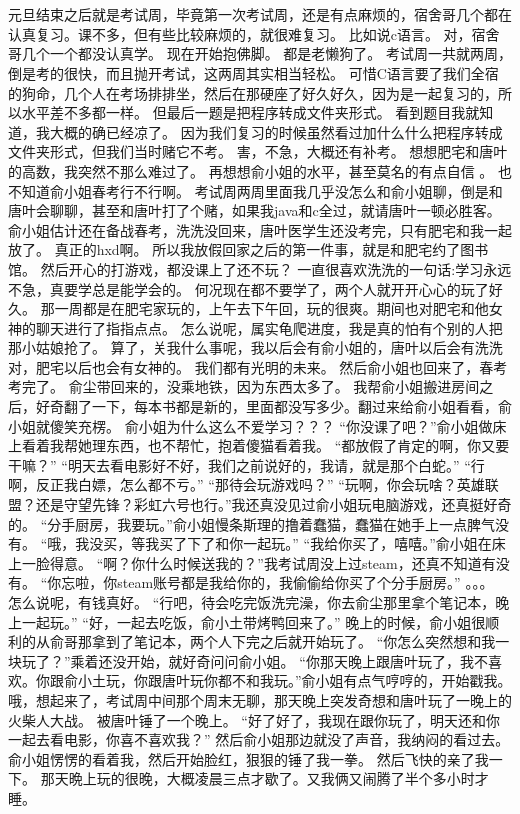\chapter{}
元旦结束之后就是考试周，毕竟第一次考试周，还是有点麻烦的，宿舍哥几个都在认真复习。课不多，但有些比较麻烦的，就很难复习。
比如说c语言。
对，宿舍哥几个一个都没认真学。
现在开始抱佛脚。
都是老懒狗了。
考试周一共就两周，倒是考的很快，而且抛开考试，这两周其实相当轻松。
可惜C语言要了我们全宿的狗命，几个人在考场排排坐，然后在那硬座了好久好久，因为是一起复习的，所以水平差不多都一样。
但最后一题是把程序转成文件夹形式。
看到题目我就知道，我大概的确已经凉了。
因为我们复习的时候虽然看过加什么什么把程序转成文件夹形式，但我们当时赌它不考。
害，不急，大概还有补考。
想想肥宅和唐叶的高数，我突然不那么难过了。
再想想俞小姐的水平，甚至莫名的有点自信 。
也不知道俞小姐春考行不行啊。
考试周两周里面我几乎没怎么和俞小姐聊，倒是和唐叶会聊聊，甚至和唐叶打了个赌，如果我java和c全过，就请唐叶一顿必胜客。
俞小姐估计还在备战春考，洗洗没回来，唐叶医学生还没考完，只有肥宅和我一起放了。
真正的hxd啊。
所以我放假回家之后的第一件事，就是和肥宅约了图书馆。
然后开心的打游戏，都没课上了还不玩？
一直很喜欢洗洗的一句话:学习永远不急，真要学总是能学会的。
何况现在都不要学了，两个人就开开心心的玩了好久。
那一周都是在肥宅家玩的，上午去下午回，玩的很爽。期间也对肥宅和他女神的聊天进行了指指点点。
怎么说呢，属实龟爬进度，我是真的怕有个别的人把那小姑娘抢了。
算了，关我什么事呢，我以后会有俞小姐的，唐叶以后会有洗洗对，肥宅以后也会有女神的。
我们都有光明的未来。
然后俞小姐也回来了，春考考完了。
俞尘带回来的，没乘地铁，因为东西太多了。
我帮俞小姐搬进房间之后，好奇翻了一下，每本书都是新的，里面都没写多少。翻过来给俞小姐看看，俞小姐就傻笑充楞。
俞小姐为什么这么不爱学习？？？
“你没课了吧？”俞小姐做床上看着我帮她理东西，也不帮忙，抱着傻猫看着我。
“都放假了肯定的啊，你又要干嘛？”
“明天去看电影好不好，我们之前说好的，我请，就是那个白蛇。”
“行啊，反正我白嫖，怎么都不亏。”
“那待会玩游戏吗？”
“玩啊，你会玩啥？英雄联盟？还是守望先锋？彩虹六号也行。”我还真没见过俞小姐玩电脑游戏，还真挺好奇的。
“分手厨房，我要玩。”俞小姐慢条斯理的撸着蠢猫，蠢猫在她手上一点脾气没有。
“哦，我没买，等我买了下了和你一起玩。”
“我给你买了，嘻嘻。”俞小姐在床上一脸得意。
“啊？你什么时候送我的？”我考试周没上过steam，还真不知道有没有。
“你忘啦，你steam账号都是我给你的，我偷偷给你买了个分手厨房。”
。。。
怎么说呢，有钱真好。
“行吧，待会吃完饭洗完澡，你去俞尘那里拿个笔记本，晚上一起玩。”
“好，一起去吃饭，俞小土带烤鸭回来了。”
晚上的时候，俞小姐很顺利的从俞哥那拿到了笔记本，两个人下完之后就开始玩了。
“你怎么突然想和我一块玩了？”乘着还没开始，就好奇问问俞小姐。
“你那天晚上跟唐叶玩了，我不喜欢。你跟俞小土玩，你跟唐叶玩你都不和我玩。”俞小姐有点气哼哼的，开始戳我。
哦，想起来了，考试周中间那个周末无聊，那天晚上突发奇想和唐叶玩了一晚上的火柴人大战。
被唐叶锤了一个晚上。
“好了好了，我现在跟你玩了，明天还和你一起去看电影，你喜不喜欢我？”
然后俞小姐那边就没了声音，我纳闷的看过去。
俞小姐愣愣的看着我，然后开始脸红，狠狠的锤了我一拳。
然后飞快的亲了我一下。
那天晩上玩的很晚，大概凌晨三点才歇了。又我俩又闹腾了半个多小时才睡。

